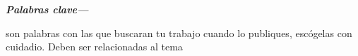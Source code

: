 \providecommand{\keywords}[1]
{
  \small	
  \textbf{\textit{Palabras clave---}} #1
}

\keywords{

son
palabras
con 
las
que
buscaran
tu
trabajo
cuando
lo
publiques,
escógelas
con
cuidadio.
Deben
ser 
relacionadas
al
tema

}